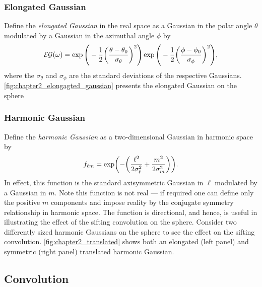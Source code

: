 

\subsubsection{Elongated Gaussian}

Define the \emph{elongated Gaussian} in the real space as a Gaussian in the polar angle \(\theta{}\) modulated by a Gaussian in the azimuthal angle \(\phi{}\) by
%
\begin{equation}
	\mathcal{EG}(\omega)
	= \exp\Bigg(-\frac{1}{2}{\bigg(\frac{\theta-\theta_{0}}{\sigma_{\theta}}\bigg)}^{2}\Bigg)
	\exp\Bigg(-\frac{1}{2}{\bigg(\frac{\phi-\phi_{0}}{\sigma_{\phi}}\bigg)}^{2}\Bigg),
\end{equation}
%
where the \(\sigma_{\theta}\) and \(\sigma_{\phi}\) are the standard deviations of the respective Gaussians.
\cref{fig:chapter2_elongagted_gaussian} presents the elongated Gaussian on the sphere



\subsubsection{Harmonic Gaussian}

Define the \emph{harmonic Gaussian} as a two-dimensional Gaussian in harmonic space by
%
\begin{equation}
	{f}_{\ell m}
	= \exp(-\bigg(\frac{{\ell}^{2}}{2\sigma_{\ell}^{2}} + \frac{{m}^{2}}{2\sigma_{m}^{2}}\bigg)).
\end{equation}
%
In effect, this function is the standard axisymmetric Gaussian in \(\ell{}\) modulated by a Gaussian in \(m\).
Note this function is not real --- if required one can define only the positive \(m\) components and impose reality by the conjugate symmetry relationship in harmonic space.
The function is directional, and hence, is useful in illustrating the effect of the sifting convolution on the sphere.
Consider two differently sized harmonic Gaussians on the sphere to see the effect on the sifting convolution.
\cref{fig:chapter2_translated} shows both an elongated (left panel) and symmetric (right panel) translated harmonic Gaussian.





\subsection{Convolution}\label{sec:chapter2_convolution}

